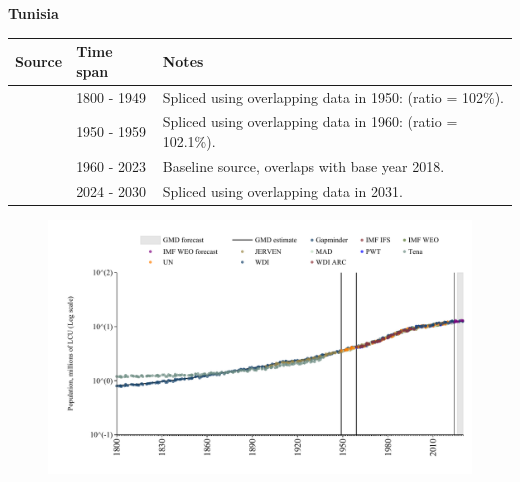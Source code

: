 \documentclass[12pt,a4paper,landscape]{article}
\begin{document}
\begin{adjustbox}{max totalsize={\paperwidth}{\paperheight},center}
\begin{minipage}[t][\textheight][t]{\textwidth}
\vspace*{0.5cm}
{}
\begin{center}
{\Large\bfseries Tunisia}
\end{center}
\vspace{0.5cm}
\begin{table}[H]
\centering
\small
\begin{tabular}{|l|l|l|}
\hline
\textbf{Source} & \textbf{Time span} & \textbf{Notes} \\
\hline
\rowcolor{white}\cite{Gapminder}& 1800 - 1949 &Spliced using overlapping data in 1950: (ratio = 102\%).\\
\rowcolor{lightgray}\cite{IMF_IFS}& 1950 - 1959 &Spliced using overlapping data in 1960: (ratio = 102.1\%).\\
\rowcolor{white}\cite{WDI}& 1960 - 2023 &Baseline source, overlaps with base year 2018.\\
\rowcolor{lightgray}\cite{Gapminder}& 2024 - 2030 &Spliced using overlapping data in 2031.\\
\hline
\end{tabular}
\end{table}
\begin{figure}[H]
\centering
\includegraphics[width=\textwidth,height=0.6\textheight,keepaspectratio]{graphs/TUN_pop.pdf}
\end{figure}
\end{minipage}
\end{adjustbox}
\end{document}
